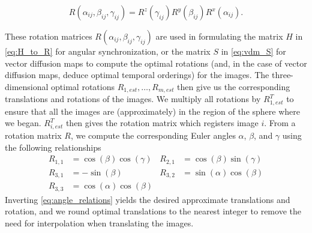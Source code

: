 \documentclass{pnastwo}
\begin{document}
\begin{article}
\begin{equation} \label{eq:total_rot}
	R(\alpha_{ij}, \beta_{ij}, \gamma_{ij})	 = R^z(\gamma_{ij})  R^y(\beta_{ij})  R^x(\alpha_{ij}).
\end{equation}
%

These rotation matrices $R(\alpha_{ij}, \beta_{ij}, \gamma_{ij})$ are used in formulating the matrix $H$ in \eqref{eq:H_to_R} for angular synchronization, or the matrix $S$ in \eqref{eq:vdm_S} for vector diffusion maps to compute the optimal rotations (and, in the case of vector diffusion maps, deduce optimal temporal orderings) for the images.
%
The three-dimensional optimal rotations $R_{1, est}, \dots, R_{m, est}$ then give us the corresponding translations and rotations of the images.
%
We multiply all rotations by $R_{1, est}^T$ to ensure that all the images are (approximately) in the region of the sphere where we began.
%
$R_{i,est}^T$ then gives the rotation matrix which registers image $i$.
%
From a rotation matrix $R$, we compute the corresponding Euler angles $\alpha$, $\beta$, and $\gamma$ using the following relationships
\begin{equation} \label{eq:angle_invert}
\begin{aligned}
R_{1,1} & = \cos(\beta)\cos(\gamma) &
R_{2,1} & = \cos(\beta)\sin(\gamma) \\
R_{3,1} & = -\sin(\beta) &
R_{3,2} & = \sin(\alpha)\cos(\beta) \\
R_{3,3} & = \cos(\alpha)\cos(\beta)  &
\end{aligned}
\end{equation}
%
Inverting \eqref{eq:angle_relations} yields the desired approximate translations and rotation, and we round optimal translations to the nearest integer to remove the need for interpolation when translating the images.


\end{article}
\end{document}
